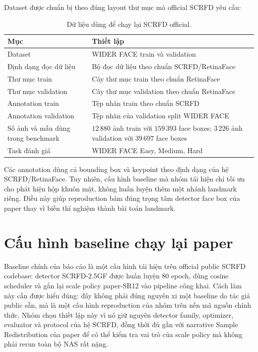 Dataset được chuẩn bị theo đúng layout thư mục mà official SCRFD yêu cầu:

\begin{table}[H]
\centering
\caption{Dữ liệu dùng để chạy lại SCRFD official.}
\small
\begin{tabular}{@{}p{}p{}@{}}
\toprule
\textbf{Mục} & \textbf{Thiết lập} \\
\midrule
Dataset & WIDER FACE train và validation \\
\midrule
Định dạng đọc dữ liệu & Bộ đọc dữ liệu theo chuẩn SCRFD/RetinaFace \\
\midrule
Thư mục train & Cây thư mục train theo chuẩn RetinaFace \\
\midrule
Thư mục validation & Cây thư mục validation theo chuẩn RetinaFace \\
\midrule
Annotation train & Tệp nhãn train theo chuẩn SCRFD \\
\midrule
Annotation validation & Tệp nhãn của validation split WIDER FACE \\
\midrule
Số ảnh và mẫu dùng trong benchmark & \(12\,880\) ảnh train với \(159\,393\) face boxes; \(3\,226\) ảnh validation với \(39\,697\) face boxes \\
\midrule
Task đánh giá & WIDER FACE Easy, Medium, Hard \\
\bottomrule
\end{tabular}
\end{table}

Các annotation dùng cả bounding box và keypoint theo định dạng của hệ SCRFD/RetinaFace. Tuy nhiên, cấu hình baseline mà nhóm tái hiện chỉ tối ưu cho phát hiện hộp khuôn mặt, không huấn luyện thêm một nhánh landmark riêng. Điều này giúp reproduction bám đúng trọng tâm detector face box của paper thay vì biến thí nghiệm thành bài toán landmark.

\section{Cấu hình baseline chạy lại paper}

Baseline chính của báo cáo là một cấu hình tái hiện trên official public SCRFD codebase: detector SCRFD-2.5GF được huấn luyện 80 epoch, dùng cosine scheduler và gắn lại scale policy paper-SR12 vào pipeline công khai. Cách làm này cần được hiểu đúng: đây không phải đúng nguyên xi một baseline do tác giả public sẵn, mà là một cấu hình reproduction của nhóm trên nền mã nguồn chính thức. Nhóm chọn thiết lập này vì nó giữ nguyên detector family, optimizer, evaluator và protocol của hệ SCRFD, đồng thời đủ gần với narrative Sample Redistribution của paper để có thể kiểm tra vai trò của scale policy mà không phải rerun toàn bộ NAS rất nặng.

